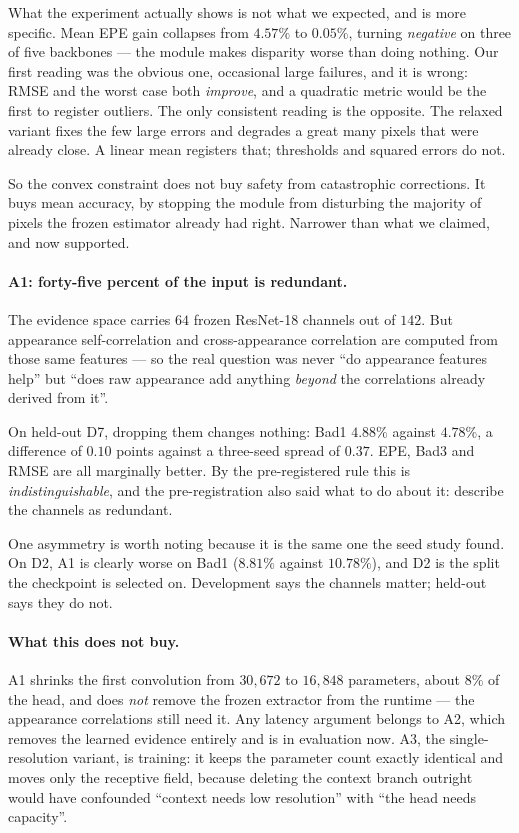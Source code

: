\documentclass[11pt,a4paper]{article}
\begin{document}
What the experiment actually shows is not what we expected, and is more
specific. Mean EPE gain collapses from $4.57\%$ to $0.05\%$, turning
\emph{negative} on three of five backbones --- the module makes disparity
worse than doing nothing. Our first reading was the obvious one,
occasional large failures, and it is wrong: RMSE and the worst case both
\emph{improve}, and a quadratic metric would be the first to register
outliers. The only consistent reading is the opposite. The relaxed variant
fixes the few large errors and degrades a great many pixels that were
already close. A linear mean registers that; thresholds and squared errors
do not.

So the convex constraint does not buy safety from catastrophic
corrections. It buys mean accuracy, by stopping the module from disturbing
the majority of pixels the frozen estimator already had right. Narrower
than what we claimed, and now supported.

\paragraph{A1: forty-five percent of the input is redundant.} The evidence
space carries $64$ frozen ResNet-18 channels out of $142$. But appearance
self-correlation and cross-appearance correlation are computed from those
same features --- so the real question was never ``do appearance features
help'' but ``does raw appearance add anything \emph{beyond} the
correlations already derived from it''.

On held-out D7, dropping them changes nothing: Bad1 $4.88\%$ against
$4.78\%$, a difference of $0.10$ points against a three-seed spread of
$0.37$. EPE, Bad3 and RMSE are all marginally better. By the
pre-registered rule this is \emph{indistinguishable}, and the
pre-registration also said what to do about it: describe the channels as
redundant.

One asymmetry is worth noting because it is the same one the seed study
found. On D2, A1 is clearly worse on Bad1 ($8.81\%$ against $10.78\%$),
and D2 is the split the checkpoint is selected on. Development says the
channels matter; held-out says they do not.

\paragraph{What this does not buy.} A1 shrinks the first convolution from
$30{,}672$ to $16{,}848$ parameters, about $8\%$ of the head, and does
\emph{not} remove the frozen extractor from the runtime --- the appearance
correlations still need it. Any latency argument belongs to A2, which
removes the learned evidence entirely and is in evaluation now. A3, the
single-resolution variant, is training: it keeps the parameter count
exactly identical and moves only the receptive field, because deleting the
context branch outright would have confounded ``context needs low
resolution'' with ``the head needs capacity''.
\end{document}
